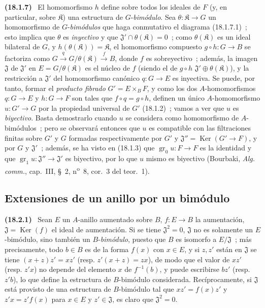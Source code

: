 \documentclass[10pt,oneside]{book}
\makeatletter
\newcommand{\setmanualcurrentlabel}[1]{\def\@currentlabel{#1}}
\newcommand{\oldpage}[2][]{%
  \setcounter{footnote}{0}%
  \marginpar{\scriptsize\textbf{#1}~|~#2}\ignorespaces}
\newenvironment{env}[1][]{\setmanualcurrentlabel{#1}\par\medskip\noindent\textbf{(#1)}\ }{\par}
\makeatother
\begin{document}
\begin{env}[18.1.7]
\oldpage[0\textsubscript{IV-1}]{54}
El homomorfismo $h$ define sobre todos los ideales de $F$ (y, en particular, sobre
$\mathfrak K$) una estructura de $G$-\emph{bimódulo}. Sea
$\theta:\mathfrak K\to G$ un homomorfismo de $G$-\emph{bimódulos} que haga
conmutativo el diagrama (18.1.7.1)~; esto implica que $\theta$ es
\emph{inyectivo} y que $\mathfrak{J}'\cap\theta(\mathfrak K)=0$~; como
$\theta(\mathfrak K)$ es un ideal bilateral de $G$, y
$h(\theta(\mathfrak K))=\mathfrak K$, el homomorfismo compuesto
$g\circ h:G\to B$ se factoriza como
$G\xrightarrow{q}G/\theta(\mathfrak K)\xrightarrow{f}B$, donde $f$ es
sobreyectivo~; además, la imagen $\mathfrak{J}$ de $\mathfrak{J}'$ en
$E=G/\theta(\mathfrak K)$ es el núcleo de $f$ (siendo el de $g\circ h$
$\mathfrak{J}'\oplus\theta(\mathfrak K)$), y la restricción a
$\mathfrak{J}'$ del homomorfismo canónico $q:G\to E$ es inyectiva. Se
puede, por tanto, formar el \emph{producto fibrado} $G'=E\times_BF$, y como los dos
$A$-homomorfismos $q:G\to E$ y $h:G\to F$ son tales que
$f\circ q=g\circ h$, definen un único $A$-homomorfismo $u:G'\to G$
por la propiedad universal de $G'$ (18.1.2)~; vamos a ver que $u$ es
\emph{biyectivo}. Basta demostrarlo cuando $u$ se considera como
homomorfismo de $A$-bimódulos~; pero se observará entonces que $u$ es compatible
con las filtraciones finitas sobre $G'$ y $G$ formadas respectivamente por $G'$
y $\mathfrak{J}''=\operatorname{Ker}(G'\to F)$, y por $G$ y
$\mathfrak{J}'$~; además, se ha visto en (18.1.3) que
$\operatorname{gr}_0u:F\to F$ es la identidad y que
$\operatorname{gr}_1u:\mathfrak{J}''\to\mathfrak{J}'$ es biyectivo, por lo que $u$
mismo es biyectivo (Bourbaki, \emph{Alg. comm.}, cap.~III, \S~2,
n\textsuperscript{o}~8, cor.~3 del teor.~1).
\end{env}

\subsection{Extensiones de un anillo por un bimódulo}
\label{subsection:0.18.2-es}

\begin{env}[18.2.1]
\label{0.18.2.1-es}
Sean $E$ un $A$-anillo aumentado sobre $B$, $f:E\to B$ la aumentación,
$\mathfrak{J}=\operatorname{Ker}(f)$ el ideal de aumentación. Si se tiene
$\mathfrak{J}^2=0$, $\mathfrak{J}$ no es solamente un $E$-bimódulo, sino
también un $B$-\emph{bimódulo}, puesto que $B$ es isomorfo a
$E/\mathfrak{J}$~; más precisamente, todo $b\in B$ es de la forma $f(x)$
con $x\in E$, y si $z,z'$ están en $\mathfrak{J}$ se tiene
$(x+z)z'=xz'$ (resp. $z'(x+z)=zx$), de modo que el valor de $xz'$ (resp.
$z'x$) no depende del elemento $x$ de $f^{-1}(b)$, y puede escribirse $bz'$
(resp. $z'b$), lo que define la estructura de $B$-bimódulo considerada.
Recíprocamente, si $\mathfrak{J}$ está provisto de una estructura de $B$-bimódulo tal
que $xz'=f(x)z'$ y $z'x=z'f(x)$ para $x\in E$ y
$z'\in\mathfrak{J}$, es claro que $\mathfrak{J}^2=0$.
\end{env}
\end{document}
